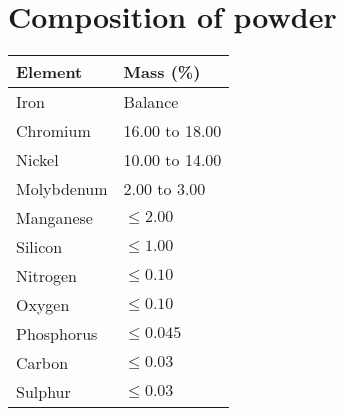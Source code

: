 \documentclass[10pt]{article}
\begin{document}
\section*{Composition of powder}
\begin{center}
\begin{tabular}{|l|l|}
\hline
Element & Mass (\%) \\
\hline
Iron & Balance \\
\hline
Chromium & 16.00 to 18.00 \\
\hline
Nickel & 10.00 to 14.00 \\
\hline
Molybdenum & 2.00 to 3.00 \\
\hline
Manganese & $\leq 2.00$ \\
\hline
Silicon & $\leq 1.00$ \\
\hline
Nitrogen & $\leq 0.10$ \\
\hline
Oxygen & $\leq 0.10$ \\
\hline
Phosphorus & $\leq 0.045$ \\
\hline
Carbon & $\leq 0.03$ \\
\hline
Sulphur & $\leq 0.03$ \\
\hline
\end{tabular}
\end{center}
\end{document}
